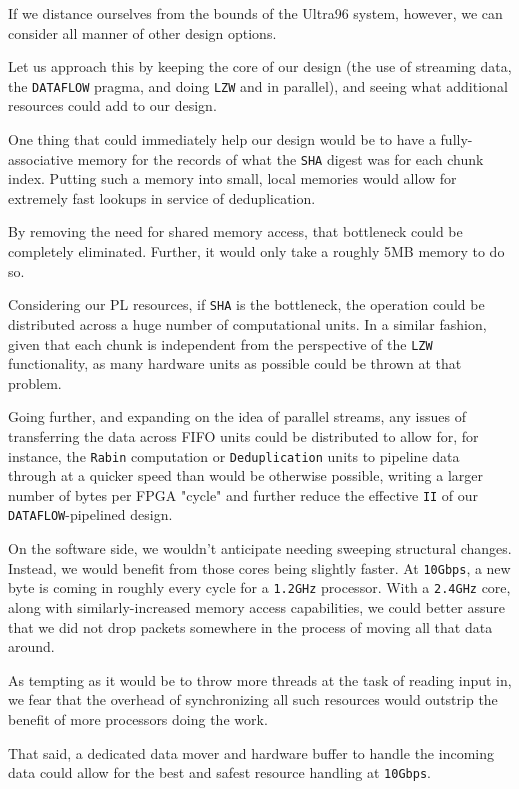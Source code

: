 \documentclass{article}
\begin{document}
If we distance ourselves from the bounds of the Ultra96 system, however, we can consider all manner of other design options.
\par
Let us approach this by keeping the core of our design (the use of streaming data, the \texttt{DATAFLOW} pragma, and doing \texttt{LZW} and  in parallel), and seeing what additional resources could add to our design.
\newline\par
One thing that could immediately help our design would be to have a fully-associative memory for the records of what the \texttt{SHA} digest was for each chunk index. Putting such a memory into small, local memories would allow for extremely fast lookups in service of deduplication.
\par
By removing the need for shared memory access, that bottleneck could be completely eliminated. Further, it would only take a roughly 5MB memory to do so.
\newline\par
Considering our PL resources, if \texttt{SHA} is the bottleneck, the operation could be distributed across a huge number of computational units. In a similar fashion, given that each chunk is independent from the perspective of the \texttt{LZW} functionality, as many hardware units as possible could be thrown at that problem.
\par
Going further, and expanding on the idea of parallel streams, any issues of transferring the data across FIFO units could be distributed to allow for, 
for instance, the \texttt{Rabin} computation or \texttt{Deduplication} units to pipeline data through at a quicker speed than would be otherwise possible, 
writing a larger number of bytes per FPGA "cycle" and further reduce the effective \texttt{II} of our \texttt{DATAFLOW}-pipelined design.
\newline\par
On the software side, we wouldn't anticipate needing sweeping structural changes. Instead, we would benefit from those cores being slightly faster. At \texttt{10Gbps}, a new byte is coming in roughly every cycle for a \texttt{1.2GHz} processor. 
With a \texttt{2.4GHz} core, along with similarly-increased memory access capabilities, we could better assure that we did not drop packets somewhere in the process of moving all that data around.
\par 
As tempting as it would be to throw more threads at the task of reading input in, we fear that the overhead of synchronizing all such resources would outstrip the benefit of more processors doing the work.
\par
That said, a dedicated data mover and hardware buffer to handle the incoming data could allow for the best and safest resource handling at \texttt{10Gbps}.
\end{document}
